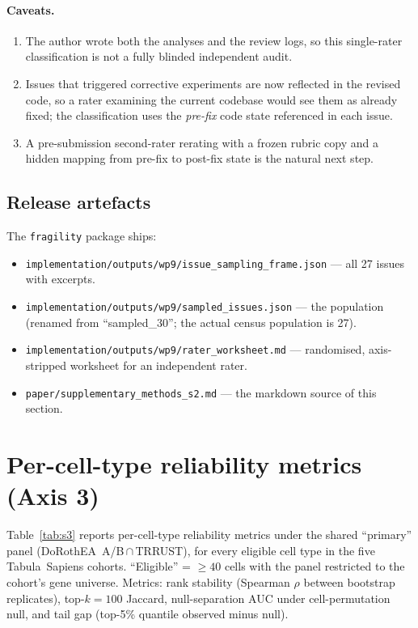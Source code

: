 \documentclass[a4paper,11pt]{article}
\begin{document}
\paragraph{Caveats.}
\begin{enumerate}
\item The author wrote both the analyses and the review logs, so this
  single-rater classification is not a fully blinded independent audit.
\item Issues that triggered corrective experiments are now reflected
  in the revised code, so a rater examining the current codebase would
  see them as already fixed; the classification uses the
  \emph{pre-fix} code state referenced in each issue.
\item A pre-submission second-rater rerating with a frozen rubric copy
  and a hidden mapping from pre-fix to post-fix state is the natural
  next step.
\end{enumerate}

\subsection{Release artefacts}

The \texttt{fragility} package ships:
\begin{itemize}
\item \texttt{implementation/outputs/wp9/issue\_sampling\_frame.json}
  --- all 27 issues with excerpts.
\item \texttt{implementation/outputs/wp9/sampled\_issues.json} ---
  the population (renamed from ``sampled\_30''; the actual census
  population is 27).
\item \texttt{implementation/outputs/wp9/rater\_worksheet.md} ---
  randomised, axis-stripped worksheet for an independent rater.
\item \texttt{paper/supplementary\_methods\_s2.md} --- the markdown
  source of this section.
\end{itemize}

\clearpage
\section{Per-cell-type reliability metrics (Axis 3)}
\label{sec:supp_table_s3}

Table~\ref{tab:s3} reports per-cell-type reliability metrics under the
shared ``primary'' panel
(DoRothEA~A/B\,$\cap$\,TRRUST), for every eligible cell type in the
five Tabula~Sapiens cohorts. ``Eligible'' = $\geq 40$ cells with the
panel restricted to the cohort's gene universe. Metrics: rank stability
(Spearman $\rho$ between bootstrap replicates), top-$k=100$ Jaccard,
null-separation AUC under cell-permutation null, and tail gap (top-5\%
quantile observed minus null).
\end{document}
